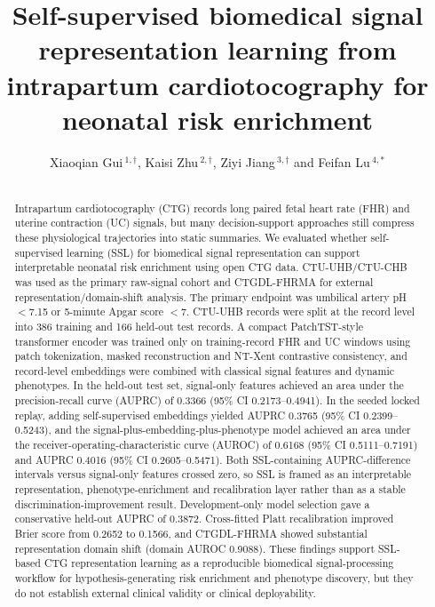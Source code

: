 \documentclass[utf8]{FrontiersinHarvard}
\def\firstAuthorLast{Gui {et~al.}}
\def\Authors{Xiaoqian Gui\,$^{1,\dagger}$, Kaisi Zhu\,$^{2,\dagger}$, Ziyi Jiang\,$^{3,\dagger}$ and Feifan Lu\,$^{4,*}$}
\begin{document}
        \onecolumn

        \title[Self-supervised CTG signal representation]{Self-supervised biomedical signal representation learning from intrapartum cardiotocography for neonatal risk enrichment}

        \author[\firstAuthorLast ]{\Authors}
        \address{}
        \correspondance{}


        \maketitle

        \begin{abstract}
        \section{}
        Intrapartum cardiotocography (CTG) records long paired fetal heart rate (FHR) and uterine contraction (UC) signals, but many decision-support approaches still compress these physiological trajectories into static summaries. We evaluated whether self-supervised learning (SSL) for biomedical signal representation can support interpretable neonatal risk enrichment using open CTG data. CTU-UHB/CTU-CHB was used as the primary raw-signal cohort and CTGDL-FHRMA for external representation/domain-shift analysis. The primary endpoint was umbilical artery pH $<$7.15 or 5-minute Apgar score $<$7. CTU-UHB records were split at the record level into 386 training and 166 held-out test records. A compact PatchTST-style transformer encoder was trained only on training-record FHR and UC windows using patch tokenization, masked reconstruction and NT-Xent contrastive consistency, and record-level embeddings were combined with classical signal features and dynamic phenotypes. In the held-out test set, signal-only features achieved an area under the precision-recall curve (AUPRC) of 0.3366 (95\% CI 0.2173--0.4941). In the seeded locked replay, adding self-supervised embeddings yielded AUPRC 0.3765 (95\% CI 0.2399--0.5243), and the signal-plus-embedding-plus-phenotype model achieved an area under the receiver-operating-characteristic curve (AUROC) of 0.6168 (95\% CI 0.5111--0.7191) and AUPRC 0.4016 (95\% CI 0.2605--0.5471). Both SSL-containing AUPRC-difference intervals versus signal-only features crossed zero, so SSL is framed as an interpretable representation, phenotype-enrichment and recalibration layer rather than as a stable discrimination-improvement result. Development-only model selection gave a conservative held-out AUPRC of 0.3872. Cross-fitted Platt recalibration improved Brier score from 0.2652 to 0.1566, and CTGDL-FHRMA showed substantial representation domain shift (domain AUROC 0.9088). These findings support SSL-based CTG representation learning as a reproducible biomedical signal-processing workflow for hypothesis-generating risk enrichment and phenotype discovery, but they do not establish external clinical validity or clinical deployability.


\end{abstract}
\end{document}
